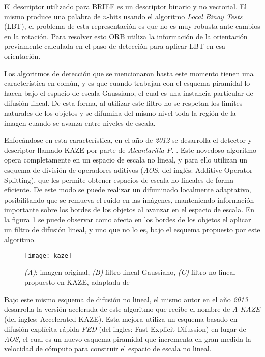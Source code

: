 El descriptor utilizado para BRIEF es un descriptor binario y no vectorial. El mismo produce una palabra de $n$-bits usando el algoritmo \textit{Local Binay Tests} (LBT), el problema de esta representación es que no es muy robusta ante cambios en la rotación. Para resolver esto ORB utiliza la información de la orientación previamente calculada en el paso de detección para aplicar LBT en esa orientación.

Los algoritmos de detección que se mencionaron hasta este momento tienen una característica en común, y es que cuando trabajan con el esquema piramidal lo hacen bajo el espacio de escala Gaussiano, el cual es una instancia particular de difusión lineal. De esta forma, al utilizar este filtro no se respetan los limites naturales de los objetos y se difumina del mismo nivel toda la región de la imagen cuando se avanza entre niveles de escala.

Enfocándose en esta característica, en el año de \textit{2012} se desarrolla el detector y descriptor llamado KAZE \cite{kaze} por parte de \textit{Alcantarilla P. }. Este novedoso algoritmo opera completamente en un espacio de escala no lineal, y para ello utilizan un esquema de división de operadores aditivos (\textit{AOS}, del inglés: Additive Operator Splitting), que les permite obtener espacios de escala no lineales de forma eficiente. De este modo se puede realizar un difuminado localmente adaptativo, posibilitando que se remueva el ruido en las imágenes, manteniendo información importante sobre los bordes de los objetos al avanzar en el espacio de escala. En la figura \ref{imagen:kaze} se puede observar como afecta en los bordes de los objetos el aplicar un filtro de difusión lineal, y uno que no lo es, bajo el esquema propuesto por este algoritmo.

\begin{figure}[H]
	\centering
	\texttt{[image: kaze]}
	\caption[Filtro no lineal propuesto por KAZE]{\textit{(A)}: imagen original, \textit{(B)} filtro lineal Gaussiano, \textit{(C)} filtro no lineal propuesto en KAZE, adaptada de \cite{kaze}}
	\label{imagen:kaze}
\end{figure}

Bajo este mismo esquema de difusión no lineal, el mismo autor en el año \textit{2013} desarrolla la versión acelerada de este algoritmo que recibe el nombre de \textit{A-KAZE} \cite{akaze} (del ingles: Accelerated KAZE). Esta mejora utiliza un esquema basado en difusión explícita rápida \textit{FED} (del ingles: Fast Explicit Difussion) en lugar de \textit{AOS}, el cual es un nuevo esquema piramidal que incrementa en gran medida la velocidad de cómputo para construir el espacio de escala no lineal.

